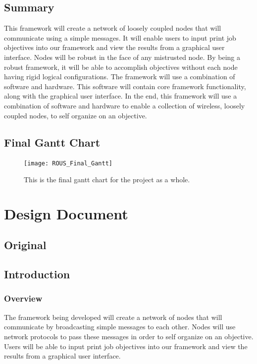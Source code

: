 \documentclass[draftclsnofoot, onecolumn, compsoc, 10pt]{IEEEtran}
\begin{document}
\subsection{Summary}
This framework will create a network of loosely coupled nodes that will communicate using a simple messages. It will enable users to input print job objectives into our framework and view the results from a graphical user interface. Nodes will be robust in the face of any mistrusted node. By being a robust framework, it will be able to accomplish objectives without each node having rigid logical configurations. The framework will use a combination of software and hardware. This software will contain core framework functionality, along with the graphical user interface. In the end, this framework will use a combination of software and hardware to enable a collection of wireless, loosely coupled nodes, to self organize on an objective.

\subsection{Final Gantt Chart}


\begin{landscape}
 \begin{figure}[H]
  \centering
  \texttt{[image: ROUS\_Final\_Gantt]}
  \captionsetup{justification=centering}
  \caption{This is the final gantt chart for the project as a whole.}
  \label{fig:label}
 \end{figure}
\end{landscape}

\section{Design Document}
\subsection{Original}


\subsection{Introduction}
\subsubsection{Overview}
The framework being developed will create a network of nodes that will communicate by broadcasting simple messages to each other. Nodes will use network protocols to pass these messages in order to self organize on an objective. Users will be able to input print job objectives into our framework and view the results from a graphical user interface.
\end{document}

